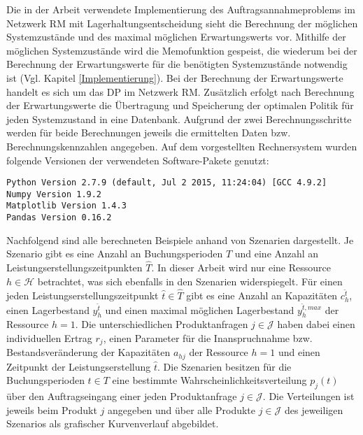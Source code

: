 Die in der Arbeit verwendete Implementierung des Auftragsannahmeproblems im Netzwerk RM mit Lagerhaltungsentscheidung sieht die Berechnung der möglichen Systemzustände und des maximal möglichen Erwartungswerts vor. Mithilfe der möglichen Systemzustände wird die Memofunktion gespeist, die wiederum bei der Berechnung der Erwartungswerte für die benötigten Systemzustände notwendig ist (Vgl. Kapitel \ref{Implementierung}). Bei der Berechnung der Erwartungswerte handelt es sich um das DP im Netzwerk RM. Zusätzlich erfolgt nach Berechnung der Erwartungswerte die Übertragung und Speicherung der optimalen Politik für jeden Systemzustand in eine Datenbank. Aufgrund der zwei Berechnungsschritte werden für beide Berechnungen jeweils die ermittelten Daten bzw. Berechnungskennzahlen angegeben.  Auf dem vorgestellten Rechnersystem wurden folgende Versionen der verwendeten Software-Pakete genutzt:

\colorbox{hellgrau}{\parbox{14cm}{\texttt{Python Version 2.7.9 (default, Jul  2 2015, 11:24:04) [GCC 4.9.2]\\
Numpy Version 1.9.2\\
Matplotlib Version 1.4.3\\
Pandas Version 0.16.2
}}}

Nachfolgend sind alle berechneten Beispiele anhand von Szenarien dargestellt. Je Szenario gibt es eine Anzahl an Buchungsperioden $T$ und eine Anzahl an Leistungserstellungszeitpunkten $\hat T$. In dieser Arbeit wird nur eine Ressource $h\in\mathcal{H}$ betrachtet, was sich ebenfalls in den Szenarien widerspiegelt. Für einen jeden Leistungserstellungszeitpunkt $\hat t \in \hat T$ gibt es eine Anzahl an Kapazitäten $c_h^{\hat t}$, einen Lagerbestand $y_h^{\hat t}$ und einen maximal möglichen Lagerbestand $y_h^{{\hat t},max}$ der Ressource $h=1$. Die unterschiedlichen Produktanfragen $j\in\mathcal{J}$ haben dabei einen individuellen Ertrag $r_j$, einen Parameter für die Inanspruchnahme bzw. Bestandsveränderung der Kapazitäten $a_{hj}$ der Ressource $h=1$ und einen Zeitpunkt der Leistungserstellung $\hat t$. Die Szenarien besitzen für die Buchungsperioden $t\in T$ eine bestimmte Wahrscheinlichkeitsverteilung $p_j(t)$ über den Auftragseingang einer jeden Produktanfrage $j\in\mathcal{J}$. Die Verteilungen ist jeweils beim Produkt $j$ angegeben und über alle Produkte $j\in\mathcal{J}$ des jeweiligen Szenarios als grafischer Kurvenverlauf abgebildet.

